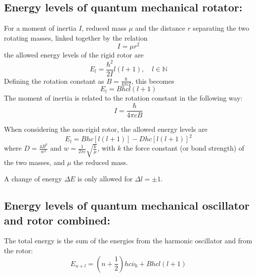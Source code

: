 \documentclass[12pt]{article}
\begin{document}
\subsection{Energy levels of quantum mechanical rotator:}
For a moment of inertia $I$, reduced mass $\mu$ and the distance $r$ separating the two rotating masses, linked together by the relation 
\begin{equation}
    I = \mu r^2
\end{equation}
the allowed energy levels of the rigid rotor are \cite{RigidRotorWikipedia}
\begin{equation}
    E_l = \frac{\hbar^2}{2 I} l(l+1), \quad l \in \mathbb{N}
\end{equation}
Defining the rotation constant as $B = \frac{\hbar}{4 \pi c I}$, this becomes
\begin{equation}
    E_l = B h c l(l+1)
\end{equation}
The moment of inertia is related to the rotation constant in the following way:
\begin{equation}
    I = \frac{\hbar}{4 \pi c B}
\end{equation}

When considering the non-rigid rotor,  the allowed energy levels are
\begin{equation}
    E_l = B h c [ l ( l + 1 ) ] - D h c [l (l+1)]^2
\end{equation}
where $D = \frac{4 B^3}{w^2}$ and $w = \frac{1}{2 \pi c} \sqrt{\frac{k}{\mu}}$, with $k$ the force constant (or bond strength) of the two masses, and $\mu$ the reduced mass.

A change of energy $\Delta E$ is only allowed for $\Delta l = \pm 1$. 

\subsection{Energy levels of quantum mechanical oscillator and rotor combined:}
The total energy is the sum of the energies from the harmonic oscillator and from the rotor:
\begin{equation}
    E_{n+l} = \left( n + \frac{1}{2} \right) hc \overline{\nu}_0 + B hc l(l+1)
\end{equation}
\end{document}
